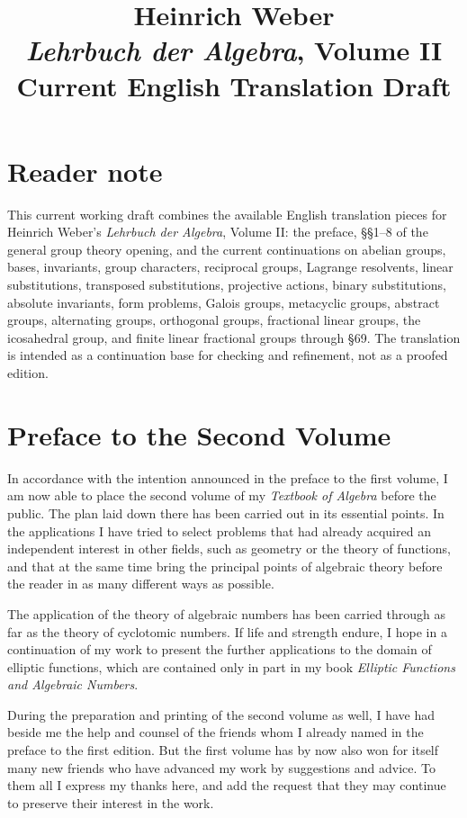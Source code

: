\documentclass[11pt]{article}
\title{Heinrich Weber\\\textit{Lehrbuch der Algebra}, Volume II\\Current English Translation Draft}
\author{}
\date{}
\begin{document}
\maketitle

\section*{Reader note}
This current working draft combines the available English translation pieces for Heinrich Weber's \emph{Lehrbuch der Algebra}, Volume II: the preface, \S\S 1--8 of the general group theory opening, and the current continuations on abelian groups, bases, invariants, group characters, reciprocal groups, Lagrange resolvents, linear substitutions, transposed substitutions, projective actions, binary substitutions, absolute invariants, form problems, Galois groups, metacyclic groups, abstract groups, alternating groups, orthogonal groups, fractional linear groups, the icosahedral group, and finite linear fractional groups through \S 69.
The translation is intended as a continuation base for checking and refinement, not as a proofed edition.

\section*{Preface to the Second Volume}
In accordance with the intention announced in the preface to the first volume, I am now able to place the second volume of my \emph{Textbook of Algebra} before the public. The plan laid down there has been carried out in its essential points. In the applications I have tried to select problems that had already acquired an independent interest in other fields, such as geometry or the theory of functions, and that at the same time bring the principal points of algebraic theory before the reader in as many different ways as possible.

The application of the theory of algebraic numbers has been carried through as far as the theory of cyclotomic numbers. If life and strength endure, I hope in a continuation of my work to present the further applications to the domain of elliptic functions, which are contained only in part in my book \emph{Elliptic Functions and Algebraic Numbers}.

During the preparation and printing of the second volume as well, I have had beside me the help and counsel of the friends whom I already named in the preface to the first edition. But the first volume has by now also won for itself many new friends who have advanced my work by suggestions and advice. To them all I express my thanks here, and add the request that they may continue to preserve their interest in the work.
\end{document}
